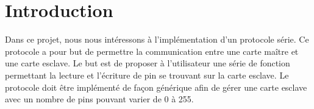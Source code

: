 \section{Introduction}
Dans ce projet, nous nous intéressons à l'implémentation d'un protocole série.
Ce protocole a pour but de permettre la communication entre une carte maître et une carte esclave.
Le but est de proposer à l'utilisateur une série de fonction permettant la lecture et l'écriture de pin se trouvant sur la carte esclave.
Le protocole doit être implémenté de façon générique afin de gérer une carte esclave avec un nombre de pins pouvant varier de 0 à 255.

